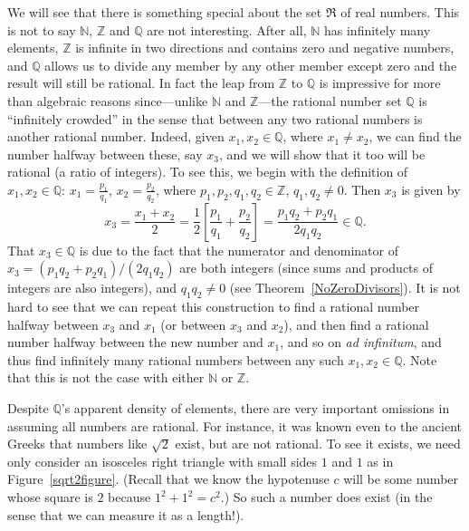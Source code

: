 We will see that
there is something special about the set $\Re$ of real numbers. 
This is not to say $\mathbb{N}$, $\mathbb{Z}$ and $\mathbb{Q}$
are not interesting.  After all, $\mathbb{N}$ 
has infinitely many elements, $\mathbb{Z}$
is infinite in two directions and contains
zero and negative numbers, and $\mathbb{Q}$
allows us to divide  any member by any other member
except  zero and the result will still be rational. 
In fact the leap from $\mathbb{Z}$ to $\mathbb{Q}$
is impressive for more than algebraic reasons since---unlike 
$\mathbb{N}$ and $\mathbb{Z}$---the
rational number set $\mathbb{Q}$ is ``infinitely crowded''
in the sense that between any two rational
numbers is another rational number.
Indeed, 
given $x_1,x_2\in\mathbb{Q}$, where $x_1\ne x_2$, we can
find the number halfway between these, say $x_3$, and
we will show that it too will be rational (a ratio of integers).  
To see this, we begin with the definition of $x_1,x_2\in\mathbb{Q}$:
$x_1=\frac{p_1}{q_1}$, $x_2=\frac{p_2}{q_2}$, where
$p_1,p_2,q_1,q_2\in\mathbb{Z}$, $q_1,q_2\ne0$.
Then  $x_3$ is given by 
$$x_3=\frac{x_1+x_2}{2}=\frac12\left[\frac{p_1}{q_1}+\frac{p_2}{q_2}
\right]=\frac{p_1q_2+p_2q_1}{2q_1q_2}\in\mathbb{Q}.$$ 
That $x_3\in\mathbb{Q}$ 
is due to the fact that the numerator and denominator 
of $x_3=(p_1q_2+p_2q_1)/(2q_1q_2)$ are both integers (since
sums and products of integers are also integers),
and $q_1q_2\ne0$ (see Theorem~\ref{NoZeroDivisors}).
It is not hard to see that we can repeat this construction
to find a rational number halfway between $x_3$ and $x_1$
(or between $x_3$ and $x_2$),
and then find  a rational number halfway between the new number and 
$x_1$, and so on {\it ad infinitum}\footnotemark,%
and thus find  infinitely many
rational numbers between any such $x_1,x_2\in\mathbb{Q}$.
Note that this is not the case with either $\mathbb{N}$
or $\mathbb{Z}$.


Despite $\mathbb{Q}$'s apparent density of elements, 
there are very important omissions in assuming
all numbers are rational.  For instance,
it was known even to the ancient Greeks that numbers like $\sqrt2$
exist, but are not rational.  To see it exists, we need
only consider an isosceles right triangle with 
small sides $1$ and $1$ as in Figure~\ref{sqrt2figure}.
(Recall that we know the hypotenuse $c$ will be some
number whose square is $2$ because $1^2+1^2=c^2$.) 
So such a number does exist (in the sense that we
can measure it as a length!).

